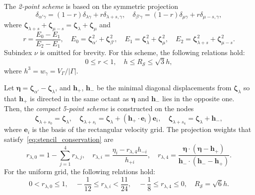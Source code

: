 \documentclass[review]{elsarticle}
\newcommand{\bzeta}{\boldsymbol{\zeta}}
\newcommand{\bh}{\boldsymbol{h}}
\newcommand{\be}{\boldsymbol{e}}
\begin{document}
The \emph{2-point scheme} is based on the symmetric projection
\begin{equation}\label{eq:uniform_projection}
    \delta_{\alpha'\gamma} = (1-r)\delta_{\lambda\gamma} + r\delta_{\lambda+s,\gamma}, \quad
    \delta_{\beta'\gamma} = (1-r)\delta_{\mu\gamma} + r\delta_{\mu-s,\gamma},
\end{equation}
where \(\bzeta_{\lambda+s} + \bzeta_{\mu-s} = \bzeta_{\lambda} + \bzeta_{\mu}\) and
\begin{equation}\label{eq:stencil_weights2}
    r = \frac{E_0-E_1}{E_2-E_1}, \quad
    E_0 = \bzeta_{\alpha'}^2 + \bzeta_{\beta'}^2, \quad
    E_1 = \bzeta_{\lambda}^2 + \bzeta_{\mu}^2, \quad
    E_2 = \bzeta_{\lambda+s}^2 + \bzeta_{\mu-s}^2.
\end{equation}
Subindex \(\nu\) is omitted for brevity.
For this scheme, the following relations hold:
\begin{equation}\label{eq:weights_ranges2}
    0 \leq r < 1, \quad h \leq R_{\mathcal{S}} \leq \sqrt3h,
\end{equation}
where \(h^3 = w_\gamma = V_\Gamma/|\Gamma|\).

Let \(\boldsymbol{\eta} = \bzeta_{\alpha'} - \bzeta_{\lambda}\),
and \(\bh_+\), \(\bh_-\) be the minimal diagonal displacements from \(\bzeta_{\lambda}\)
so that \(\bh_+\) is directed in the same octant as \(\boldsymbol{\eta}\)
and \(\bh_-\) lies in the opposite one.
Then, the \emph{compact 5-point scheme} is constructed on the nodes
\begin{equation}\label{eq:stencil_nodes5}
    \bzeta_{\lambda+s_0} = \bzeta_{\lambda}, \quad
    \bzeta_{\lambda+s_i} = \bzeta_{\lambda} + (\bh_+\cdot \be_i)\be_i, \quad
    \bzeta_{\lambda+s_4} = \bzeta_{\lambda} + \bh_-,
\end{equation}
where \(\be_i\) is the basis of the rectangular velocity grid.
The projection weights that satisfy~\eqref{eq:stencil_conservation} are
\begin{equation}\label{eq:stencil_weights5}
    r_{\lambda,0} = 1 - \sum_{j=1}^4 r_{\lambda,j}, \quad
    r_{\lambda,i} = \frac{\eta_i - r_{\lambda,4}h_{-i}}{h_{+i}}, \quad
    r_{\lambda,4} = \frac{\boldsymbol{\eta}\cdot(\boldsymbol{\eta} - \bh_+)}
        {\bh_-\cdot(\bh_- - \bh_+)}.
\end{equation}
For the uniform grid, the following relations hold:
\begin{equation}\label{eq:weights_ranges5}
    0 < r_{\lambda,0} \leq 1, \quad
    -\frac1{12} \leq r_{\lambda,i} < \frac{11}{24}, \quad
    -\frac18 \leq r_{\lambda,4} \leq 0, \quad
    R_\mathcal{S} = \sqrt6h.
\end{equation}
\end{document}
